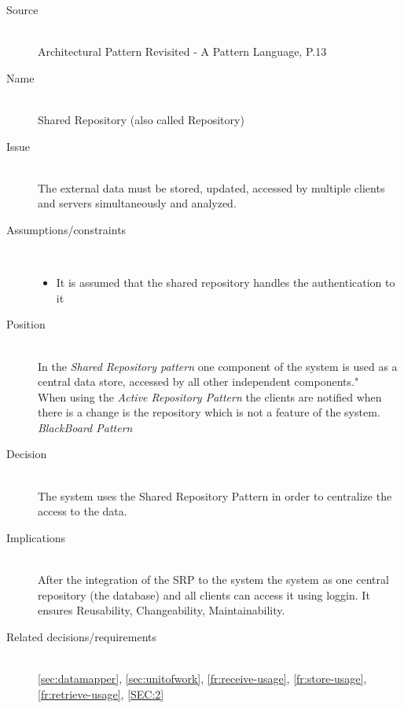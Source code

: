 \begin{description}
\item [Source]~\\
Architectural Pattern Revisited - A Pattern Language, P.13 \cite{avgeriou2005architectural}

 \item [Name] ~\\ 
 Shared Repository (also called Repository)
 \item [Issue]~ \\
  The external data must be stored, updated, accessed by multiple clients and servers simultaneously and analyzed.
 \item [Assumptions/constraints]~
 \begin{itemize}
 \item It is assumed that the shared repository handles the authentication to it
 \end{itemize}
 \item [Position]~ \\ 
 In the \textit{Shared Repository pattern} one component of the system is used as a central data store, accessed by all other independent components."\\
 When using the \textit{Active Repository Pattern} the clients are notified when there is a change is the repository which is not a feature of the system.\\
 \textit{BlackBoard Pattern} \\
 \item [Decision]~\\ 
 The system uses the Shared Repository Pattern in order to centralize the access to the data.\\
 \item [Implications]~ \\ 
 After the integration of the SRP to the system the system as one central repository (the database) and all clients can access it using loggin. It ensures Reusability, Changeability, Maintainability. \\
\item [Related decisions/requirements]~\\ 
\ref{sec:datamapper}, \ref{sec:unitofwork}, \ref{fr:receive-usage}, \ref{fr:store-usage}, \ref{fr:retrieve-usage}, \ref{SEC:2} \\

 \end{description}

